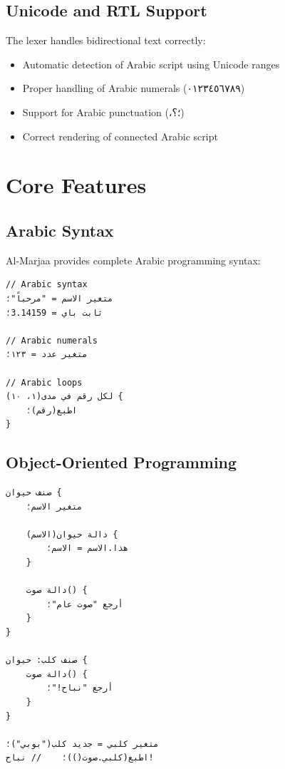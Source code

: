 \documentclass[11pt,a4paper]{article}
\begin{document}
\subsection{Unicode and RTL Support}

The lexer handles bidirectional text correctly:

\begin{itemize}
    \item Automatic detection of Arabic script using Unicode ranges
    \item Proper handling of Arabic numerals (٠١٢٣٤٥٦٧٨٩)
    \item Support for Arabic punctuation (،؛؟)
    \item Correct rendering of connected Arabic script
\end{itemize}

\section{Core Features}
\label{sec:features}

\subsection{Arabic Syntax}

Al-Marjaa provides complete Arabic programming syntax:

\begin{lstlisting}[language={},title={Arabic Variable Declaration}]
// Arabic syntax
متغير الاسم = "مرحباً"؛
ثابت باي = 3.14159؛

// Arabic numerals
متغير عدد = ١٢٣؛

// Arabic loops
لكل رقم في مدى(١، ١٠) {
    اطبع(رقم)؛
}
\end{lstlisting}

\subsection{Object-Oriented Programming}

\begin{lstlisting}[language={},title={OOP in Arabic}]
صنف حيوان {
    متغير الاسم؛
    
    دالة حيوان(الاسم) {
        هذا.الاسم = الاسم؛
    }
    
    دالة صوت() {
        أرجع "صوت عام"؛
    }
}

صنف كلب: حيوان {
    دالة صوت() {
        أرجع "نباح!"؛
    }
}

متغير كلبي = جديد كلب("بوبي")؛
اطبع(كلبي.صوت())؛    // نباح!
\end{lstlisting}
\end{document}

